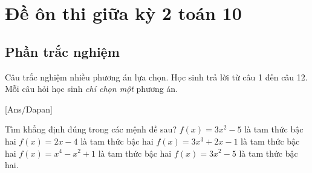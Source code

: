 \section{Đề ôn thi giữa kỳ 2 toán 10}
\subsection{Phần trắc nghiệm}
Câu trắc nghiệm nhiều phương án lựa chọn. Học sinh trả lời từ
câu 1 đến câu 12. Mỗi câu hỏi học sinh \textit{chỉ chọn một} phương án.

[Ans/Dapan]
\begin{ex}%
Tìm khẳng định đúng trong các mệnh đề sau?
\choice
{\True $f(x)=3x^2-5$ là tam thức bậc hai}
{$f(x)=2x-4$ là tam thức bậc hai}
{$f(x)=3x^3+2x-1$ là tam thức bậc hai}
{$f(x)=x^4-x^2+1$ là tam thức bậc hai}
\loigiai
{$f(x)=3x^2-5$ là tam thức bậc hai.}
\end{ex}

